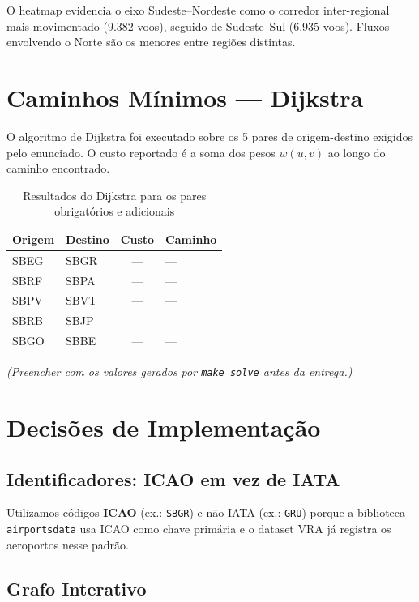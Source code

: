 \documentclass[12pt,a4paper]{article}
\begin{document}
O heatmap evidencia o eixo Sudeste--Nordeste como o corredor inter-regional mais movimentado
(9.382 voos), seguido de Sudeste--Sul (6.935 voos). Fluxos envolvendo o Norte são os menores
entre regiões distintas.

\section{Caminhos Mínimos --- Dijkstra}

O algoritmo de Dijkstra foi executado sobre os 5 pares de origem-destino exigidos pelo enunciado.
O custo reportado é a soma dos pesos $w(u,v)$ ao longo do caminho encontrado.

\begin{table}[H]
\centering
\caption{Resultados do Dijkstra para os pares obrigatórios e adicionais}
\begin{tabular}{llcl}
\toprule
\textbf{Origem} & \textbf{Destino} & \textbf{Custo} & \textbf{Caminho} \\
\midrule
SBEG & SBGR & --- & --- \\
SBRF & SBPA & --- & --- \\
SBPV & SBVT & --- & --- \\
SBRB & SBJP & --- & --- \\
SBGO & SBBE & --- & --- \\
\bottomrule
\end{tabular}
\end{table}

\noindent\textit{(Preencher com os valores gerados por \texttt{make solve} antes da entrega.)}

\section{Decisões de Implementação}

\subsection{Identificadores: ICAO em vez de IATA}

Utilizamos códigos \textbf{ICAO} (ex.: \texttt{SBGR}) e não IATA (ex.: \texttt{GRU}) porque a
biblioteca \texttt{airportsdata} usa ICAO como chave primária e o dataset VRA já registra os
aeroportos nesse padrão.

\subsection{Grafo Interativo}
\end{document}
